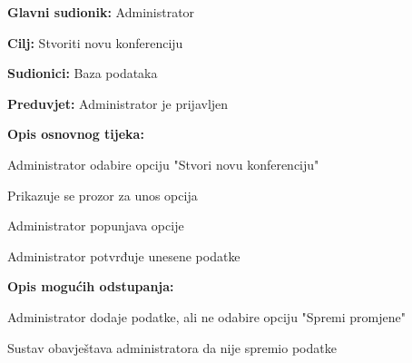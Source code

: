 	\noindent {}
	\begin{packed_item}
		
		\item \textbf{Glavni sudionik: }Administrator
		\item  \textbf{Cilj:} Stvoriti novu konferenciju
		\item  \textbf{Sudionici:} Baza podataka
		\item  \textbf{Preduvjet:} Administrator je prijavljen
		\item  \textbf{Opis osnovnog tijeka:}
		
		\item[] \begin{packed_enum}
			
			\item Administrator odabire opciju "Stvori novu konferenciju"
			\item Prikazuje se prozor za unos opcija
			\item Administrator popunjava opcije
			\item Administrator potvrđuje unesene podatke
			
		\end{packed_enum}
		
		\item  \textbf{Opis mogućih odstupanja:}
		
		\item[] \begin{packed_item}
			
			\item[1.a] Administrator dodaje podatke, ali ne odabire opciju "Spremi promjene"
			\item[] \begin{packed_enum}
				\item Sustav obavještava administratora da nije spremio podatke\newline\newline\newline
				
			\end{packed_enum}
		\end{packed_item}
	\end{packed_item}

